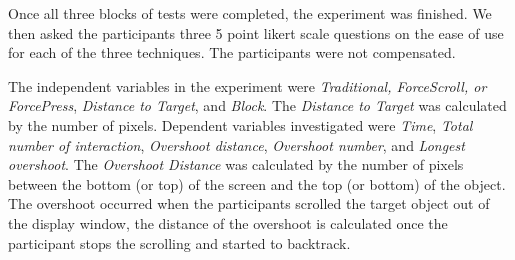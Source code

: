 \documentclass{sigchi}
\begin{document}
%
%
%

Once all three blocks of tests were completed, the experiment was finished. We then asked the participants three 5 point likert scale questions on the ease of use for each of the three techniques. The participants were not compensated.

The independent variables in the experiment were \textit{Traditional, ForceScroll, or ForcePress}, \textit{Distance to Target}, and \textit{Block}. The \textit{Distance to Target} was calculated by the number of pixels. Dependent variables investigated were \textit{Time}, \textit{Total number of interaction}, \textit{Overshoot distance}, \textit{Overshoot number}, and \textit{Longest overshoot}. The \textit{Overshoot Distance} was calculated by the number of pixels between the bottom (or top) of the screen and the top (or bottom) of the object. The overshoot occurred when the participants scrolled the target object out of the display window, the distance of the overshoot is calculated once the participant stops the scrolling and started to backtrack.   
\end{document}
